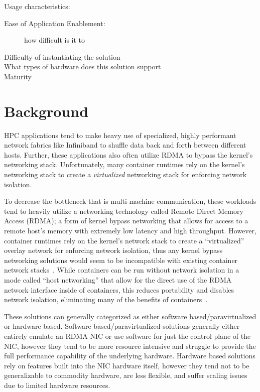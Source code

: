\documentclass[12pt,titlepage]{article}
\begin{document}
Usage characteristics:
\begin{description}
   \item[Ease of Application Enablement:] how difficult is it to
   \item[Difficulty of instantiating the solution]
   \item[What types of hardware does this solution support]
   \item[Maturity]
\end{description}

\section{Background}
HPC applications tend to make heavy use of specialized, highly performant network fabrics like Infiniband to shuffle data back and forth between different hosts.
Further, these applications also often utilize RDMA to bypass the kernel's networking stack.
Unfortunately, many container runtimes rely on the kernel's networking stack to create a \textit{virtualized} networking stack for enforcing network isolation.

To decrease the bottleneck that is multi-machine communication, these workloads tend to heavily utilize a networking technology called Remote Direct Memory Access (RDMA); a form of kernel bypass networking that allows for access to a remote host's memory with extremely low latency and high throughput.
However, container runtimes rely on the kernel's network stack to create a ``virtualized'' overlay network for enforcing network isolation, thus any kernel bypass networking solutions would seem to be incompatible with existing container network stacks~\cite{abbasi2019performance}.
While containers can be run without network isolation in a mode called ``host networking'' that allow for the direct use of the RDMA network interface inside of containers, this reduces portability and disables network isolation, eliminating many of the benefits of containers~\cite{dockerhostnetworking}.

These solutions can generally categorized as either software based/paravirtualized or hardware-based.
Software based/paravirtualized solutions generally either entirely emulate an RDMA NIC or use software for just the control plane of the NIC, however they tend to be more resource intensive and struggle to provide the full performance capability of the underlying hardware.
Hardware based solutions rely on features built into the NIC hardware itself, however they tend not to be generalizable to commodity hardware, are less flexible, and suffer scaling issues due to limited hardware resources.
\end{document}
